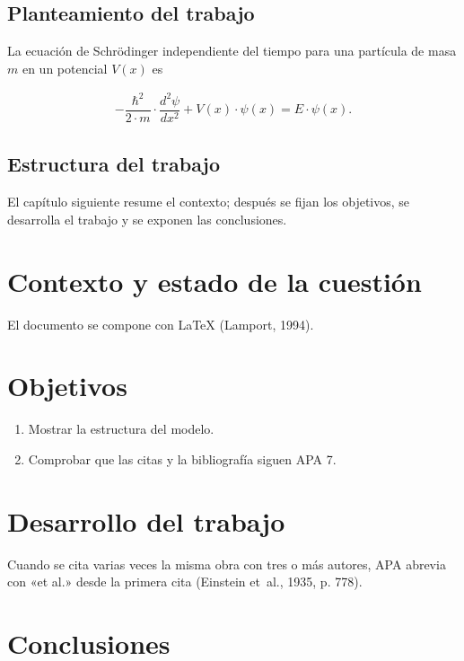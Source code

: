 \documentclass[11pt,a4paper,spanish]{book}
\providecommand{\tightlist}{%
  \setlength{\itemsep}{0pt}\setlength{\parskip}{0pt}}
\begin{document}
\section{Planteamiento del trabajo}\label{planteamiento-del-trabajo}

La ecuación de Schrödinger independiente del tiempo para una partícula
de masa \(m\) en un potencial \(V(x)\) es

\[
\begin{aligned}
-\dfrac{\hbar^2}{2 \cdot m} \cdot \dfrac{d^2 \psi}{dx^2} + V(x) \cdot \psi(x) = E \cdot \psi(x).
\end{aligned}
\]

\section{Estructura del trabajo}\label{estructura-del-trabajo}

El capítulo siguiente resume el contexto; después se fijan los
objetivos, se desarrolla el trabajo y se exponen las conclusiones.

\chapter{Contexto y estado de la
cuestión}\label{contexto-y-estado-de-la-cuestiuxf3n}

El documento se compone con \LaTeX{} (Lamport, 1994).

\chapter{Objetivos}\label{objetivos}

\begin{enumerate}
\def\labelenumi{\arabic{enumi}.}
\tightlist
\item
  Mostrar la estructura del modelo.
\item
  Comprobar que las citas y la bibliografía siguen APA 7.
\end{enumerate}

\chapter{Desarrollo del trabajo}\label{desarrollo-del-trabajo}

Cuando se cita varias veces la misma obra con tres o más autores, APA
abrevia con «et al.» desde la primera cita (Einstein et~al., 1935, p.
778).

\chapter{Conclusiones}\label{conclusiones}
\end{document}

